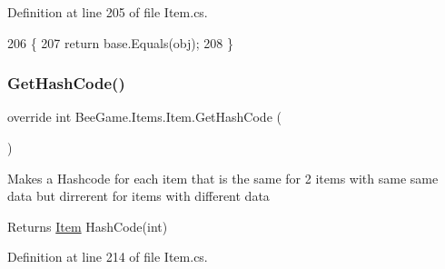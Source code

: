 Definition at line 205 of file Item.\+cs.


\begin{DoxyCode}
206         \{
207             \textcolor{keywordflow}{return} base.Equals(obj);
208         \}
\end{DoxyCode}
\mbox{\label{struct_bee_game_1_1_items_1_1_item_a6fc3c59404158c419ce0128802cbad60}} 
\subsubsection{\texorpdfstring{Get\+Hash\+Code()}{GetHashCode()}}
{\footnotesize\ttfamily override int Bee\+Game.\+Items.\+Item.\+Get\+Hash\+Code (\begin{DoxyParamCaption}{ }\end{DoxyParamCaption})}



Makes a Hashcode for each item that is the same for 2 items with same same data but dirrerent for items with different data 

\begin{DoxyReturn}{Returns}
\hyperlink{struct_bee_game_1_1_items_1_1_item}{Item} Hash\+Code(int)
\end{DoxyReturn}


Definition at line 214 of file Item.\+cs.



